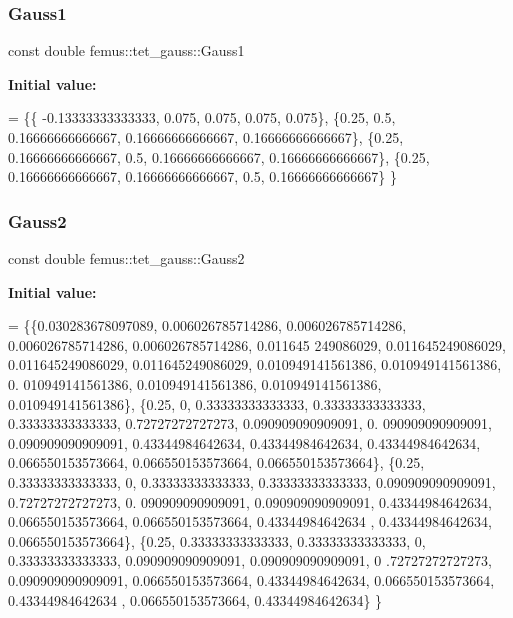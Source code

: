 \subsubsection{\texorpdfstring{Gauss1}{Gauss1}}
{\footnotesize\ttfamily const double femus\+::tet\+\_\+gauss\+::\+Gauss1\hspace{0.3cm}{\ttfamily [static]}}

{\bfseries Initial value\+:}
\begin{DoxyCode}
= \{\{ -0.13333333333333, 0.075, 0.075, 0.075, 0.075\},
    \{0.25, 0.5, 0.16666666666667, 0.16666666666667, 0.16666666666667\},
    \{0.25, 0.16666666666667, 0.5, 0.16666666666667, 0.16666666666667\},
    \{0.25, 0.16666666666667, 0.16666666666667, 0.5, 0.16666666666667\}
  \}
\end{DoxyCode}
\mbox{\label{classfemus_1_1tet__gauss_a8362fd14ea7673223137a1a979449a9e}} 
\subsubsection{\texorpdfstring{Gauss2}{Gauss2}}
{\footnotesize\ttfamily const double femus\+::tet\+\_\+gauss\+::\+Gauss2\hspace{0.3cm}{\ttfamily [static]}}

{\bfseries Initial value\+:}
\begin{DoxyCode}
= \{\{0.030283678097089, 0.006026785714286, 0.006026785714286, 0.006026785714286, 0.006026785714286, 0.011645
      249086029, 0.011645249086029, 0.011645249086029, 0.011645249086029, 0.010949141561386, 0.010949141561386, 0.
      010949141561386, 0.010949141561386, 0.010949141561386, 0.010949141561386\},
    \{0.25, 0, 0.33333333333333, 0.33333333333333, 0.33333333333333, 0.72727272727273, 0.090909090909091, 0.
      090909090909091, 0.090909090909091, 0.43344984642634, 0.43344984642634, 0.43344984642634, 0.066550153573664,
       0.066550153573664, 0.066550153573664\},
    \{0.25, 0.33333333333333, 0, 0.33333333333333, 0.33333333333333, 0.090909090909091, 0.72727272727273, 0.
      090909090909091, 0.090909090909091, 0.43344984642634, 0.066550153573664, 0.066550153573664, 0.43344984642634
      , 0.43344984642634, 0.066550153573664\},
    \{0.25, 0.33333333333333, 0.33333333333333, 0, 0.33333333333333, 0.090909090909091, 0.090909090909091, 0
      .72727272727273, 0.090909090909091, 0.066550153573664, 0.43344984642634, 0.066550153573664, 0.43344984642634
      , 0.066550153573664, 0.43344984642634\}
  \}
\end{DoxyCode}
\mbox{\label{classfemus_1_1tet__gauss_a808c1acbb90665d6f95118cd67bdc447}} 

